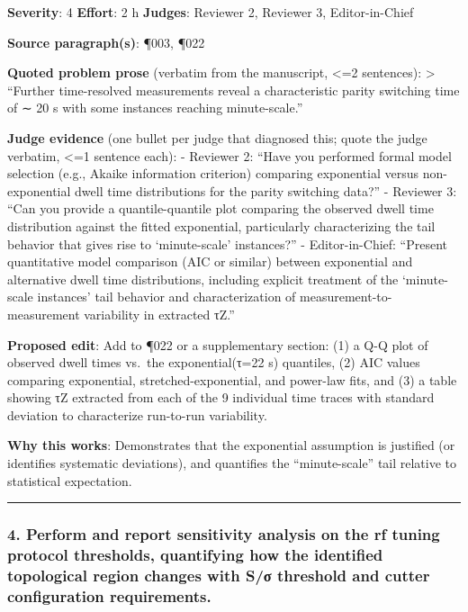 \documentclass[10pt,letterpaper]{article}
\begin{document}
\textbf{Severity}: 4 \textbf{Effort}: 2 h \textbf{Judges}: Reviewer 2, Reviewer 3, Editor-in-Chief

\textbf{Source paragraph(s)}: ¶003, ¶022

\textbf{Quoted problem prose} (verbatim from the manuscript, \textless=2 sentences):
\textgreater{} ``Further time-resolved measurements reveal a characteristic parity switching time of ∼ 20 s with some instances reaching minute-scale.''

\textbf{Judge evidence} (one bullet per judge that diagnosed this; quote the judge verbatim, \textless=1 sentence each):
- Reviewer 2: ``Have you performed formal model selection (e.g., Akaike information criterion) comparing exponential versus non-exponential dwell time distributions for the parity switching data?''
- Reviewer 3: ``Can you provide a quantile-quantile plot comparing the observed dwell time distribution against the fitted exponential, particularly characterizing the tail behavior that gives rise to `minute-scale' instances?''
- Editor-in-Chief: ``Present quantitative model comparison (AIC or similar) between exponential and alternative dwell time distributions, including explicit treatment of the `minute-scale instances' tail behavior and characterization of measurement-to-measurement variability in extracted τZ.''

\textbf{Proposed edit}: Add to ¶022 or a supplementary section: (1) a Q-Q plot of observed dwell times vs.~the exponential(τ=22 s) quantiles, (2) AIC values comparing exponential, stretched-exponential, and power-law fits, and (3) a table showing τZ extracted from each of the 9 individual time traces with standard deviation to characterize run-to-run variability.

\textbf{Why this works}: Demonstrates that the exponential assumption is justified (or identifies systematic deviations), and quantifies the ``minute-scale'' tail relative to statistical expectation.

\begin{center}\rule{0.5\linewidth}{0.5pt}\end{center}

\hypertarget{perform-and-report-sensitivity-analysis-on-the-rf-tuning-protocol-thresholds-quantifying-how-the-identified-topological-region-changes-with-sux3c3-threshold-and-cutter-configuration-requirements.}{%
\subsubsection{4. Perform and report sensitivity analysis on the rf tuning protocol thresholds, quantifying how the identified topological region changes with S/σ threshold and cutter configuration requirements.}\label{perform-and-report-sensitivity-analysis-on-the-rf-tuning-protocol-thresholds-quantifying-how-the-identified-topological-region-changes-with-sux3c3-threshold-and-cutter-configuration-requirements.}}
\end{document}
